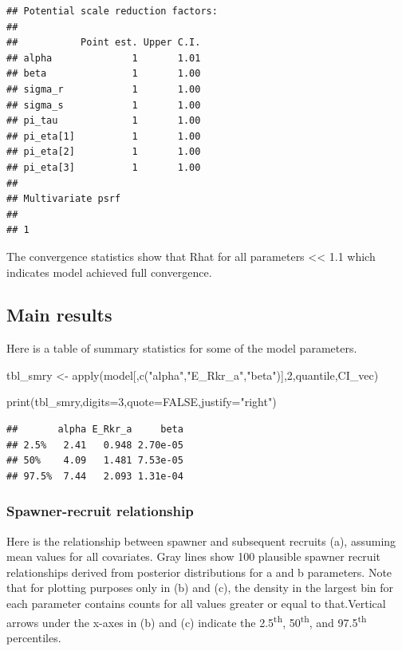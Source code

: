 \documentclass[
  11pt,
]{article}
\newenvironment{Shaded}{}{}
\newcommand{\DataTypeTok}[1]{#1}
\newcommand{\DecValTok}[1]{#1}
\newcommand{\KeywordTok}[1]{\textcolor[rgb]{0.00,0.00,1.00}{#1}}
\newcommand{\NormalTok}[1]{#1}
\newcommand{\OtherTok}[1]{\textcolor[rgb]{1.00,0.25,0.00}{#1}}
\newcommand{\StringTok}[1]{\textcolor[rgb]{0.00,0.50,0.50}{#1}}
\begin{document}
\begin{verbatim}
## Potential scale reduction factors:
## 
##           Point est. Upper C.I.
## alpha              1       1.01
## beta               1       1.00
## sigma_r            1       1.00
## sigma_s            1       1.00
## pi_tau             1       1.00
## pi_eta[1]          1       1.00
## pi_eta[2]          1       1.00
## pi_eta[3]          1       1.00
## 
## Multivariate psrf
## 
## 1
\end{verbatim}

The convergence statistics show that Rhat for all parameters
\textless\textless{} 1.1 which indicates model achieved full
convergence.

\hypertarget{main-results}{%
\subsection{Main results}\label{main-results}}

Here is a table of summary statistics for some of the model parameters.

\begin{Shaded}
\begin{Highlighting}[]
\NormalTok{tbl_smry <-}\StringTok{ }\KeywordTok{apply}\NormalTok{(model[,}\KeywordTok{c}\NormalTok{(}\StringTok{"alpha"}\NormalTok{,}\StringTok{"E_Rkr_a"}\NormalTok{,}\StringTok{"beta"}\NormalTok{)],}\DecValTok{2}\NormalTok{,quantile,CI_vec) }
                        
                        
\KeywordTok{print}\NormalTok{(tbl_smry,}\DataTypeTok{digits=}\DecValTok{3}\NormalTok{,}\DataTypeTok{quote=}\OtherTok{FALSE}\NormalTok{,}\DataTypeTok{justify=}\StringTok{"right"}\NormalTok{)}
\end{Highlighting}
\end{Shaded}

\begin{verbatim}
##       alpha E_Rkr_a     beta
## 2.5%   2.41   0.948 2.70e-05
## 50%    4.09   1.481 7.53e-05
## 97.5%  7.44   2.093 1.31e-04
\end{verbatim}

\hypertarget{spawner-recruit-relationship}{%
\subsubsection{Spawner-recruit
relationship}\label{spawner-recruit-relationship}}

Here is the relationship between spawner and subsequent recruits (a),
assuming mean values for all covariates. Gray lines show 100 plausible
spawner recruit relationships derived from posterior distributions for a
and b parameters. Note that for plotting purposes only in (b) and (c),
the density in the largest bin for each parameter contains counts for
all values greater or equal to that.Vertical arrows under the x-axes in
(b) and (c) indicate the 2.5\textsuperscript{th},
50\textsuperscript{th}, and 97.5\textsuperscript{th} percentiles.
\end{document}
